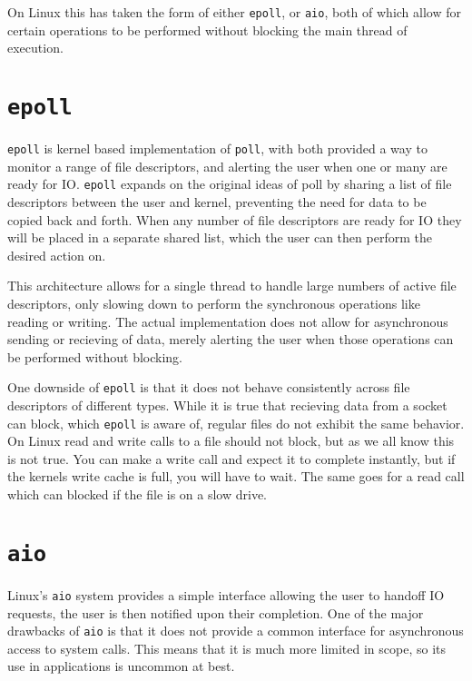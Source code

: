 \documentclass[11pt]{article}
\begin{document}
On Linux this has taken the form of either \texttt{epoll}, or \texttt{aio}, both of which allow for certain operations to be performed without blocking the main thread of execution.

\section{\texttt{epoll}}
\label{sec:org49e9171}
\texttt{epoll} is kernel based implementation of \texttt{poll}, with both provided a way to monitor a range of file descriptors, and alerting the user when one or many are ready for IO. \texttt{epoll} expands on the original ideas of poll by sharing a list of file descriptors between the user and kernel, preventing the need for data to be copied back and forth. When any number of file descriptors are ready for IO they will be placed in a separate shared list, which the user can then perform the desired action on.

This architecture allows for a single thread to handle large numbers of active file descriptors, only slowing down to perform the synchronous operations like reading or writing. The actual implementation does not allow for asynchronous sending or recieving of data, merely alerting the user when those operations can be performed without blocking.

One downside of \texttt{epoll} is that it does not behave consistently across file descriptors of different types. While it is true that recieving data from a socket can block, which \texttt{epoll} is aware of, regular files do not exhibit the same behavior. On Linux read and write calls to a file should not block, but as we all know this is not true. You can make a write call and expect it to complete instantly, but if the kernels write cache is full, you will have to wait. The same goes for a read call which can blocked if the file is on a slow drive.

\section{\texttt{aio}}
\label{sec:org27029bd}
Linux's \texttt{aio} system provides a simple interface allowing the user to handoff IO requests, the user is then notified upon their completion. One of the major drawbacks of \texttt{aio} is that it does not provide a common interface for asynchronous access to system calls. This means that it is much more limited in scope, so its use in applications is uncommon at best.
\end{document}
